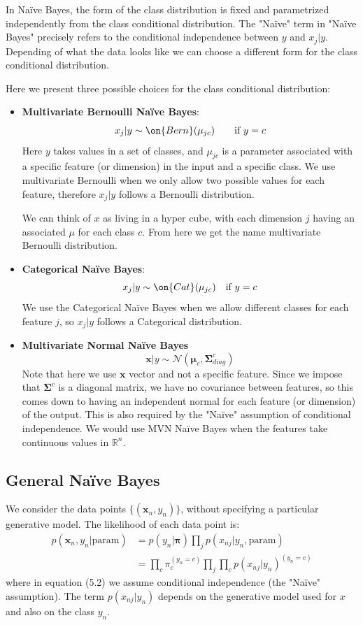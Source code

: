 \documentclass{article}
\renewcommand{\v}{\boldsymbol}
\begin{document}
\smallskip

In Na\"ive Bayes, the form of the class distribution is fixed and parametrized independently from the class conditional distribution. The "Na\"ive" term in "Na\"ive Bayes" precisely refers to the conditional independence between $y$ and $x_j|y$. Depending of what the data looks like we can choose a different form for the class conditional distribution.

\smallskip

Here we present three possible choices for the class conditional distribution:

\begin{itemize}
    \item \textbf{Multivariate Bernoulli Na\"ive Bayes}:  
    $$ x_j|y \sim \on{Bern}(\mu_{jc}) ~~~~~~\text{if $y=c$} $$
    Here $y$ takes values in a set of classes, and $\mu_{jc}$ is a parameter associated with a specific feature (or dimension) in the input and a specific class. We use multivariate Bernoulli when we only allow two possible values for each feature, therefore $x_j|y$ follows a Bernoulli distribution.
    
    We can think of $x$ as living in a hyper cube, with each dimension $j$ having an associated $\mu$ for each class $c$. From here we get the name multivariate Bernoulli distribution. 

    \item \textbf{Categorical Na\"ive Bayes}:
    $$ x_j|y \sim \on{Cat}(\mu_{jc}) ~~~\text{if $y=c$} $$
    We use the Categorical Na\"ive Bayes when we allow different classes for each feature $j$, so $x_j|y$ follows a Categorical distribution.

    \item \textbf{Multivariate Normal Na\"ive Bayes}
    $$ \v x|y \sim \mathcal{N}(\v \mu_c, \mathbf{\Sigma}_{diag}^c) $$
    Note that here we use $\v x$ vector and not a specific feature. Since we impose that $\v \Sigma^c$ is a diagonal matrix, we have no covariance between features, so this comes down to having an independent normal for each feature (or dimension) of the output. This is also required by the "Na\"ive" assumption of conditional independence. We would use  MVN Na\"ive Bayes when the features take continuous values in $\mathbb{R}^n$. 
\end{itemize}    
        
\subsection{General Na\"ive Bayes}
We consider the data points $\{(\v x_n,y_n)\}$, without specifying a particular generative model. The likelihood of each data point is:
\begin{align}
    p(\v x_n,y_n | \text{param}) &= p(y_n|\v \pi)\prod_j p(x_{nj}|y_n, \text{param})\\
    &= \prod_c \pi_c^{(y_n = c)} \prod_j \prod_c p(x_{nj}|y_n)^{(y_n=c)}
\end{align}
where in equation (5.2) we assume conditional independence (the "Na\"ive" assumption). The term $p(x_{nj}|y_n)$ depends on the generative model used for $x$ and also on the class $y_n$.
\end{document}
